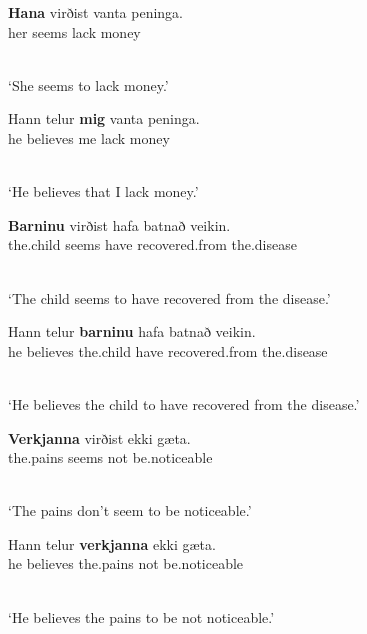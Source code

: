 \documentclass[output=paper]{langsci/langscibook}
\begin{document}
\begin{examples}
\item \label{isl:acc}
  \begin{examples}
  \item 
    \begin{gloss}
      \textbf{Hana} virðist vanta peninga. \\
      her\Acc{} seems lack\Inf{} money
    \end{gloss}\\[\glosslen]
    `She seems to lack money.'
  \item 
    \begin{gloss}
      Hann telur \textbf{mig} vanta peninga. \\
      he\Nom{} believes me\Acc{} lack\Inf{} money
    \end{gloss}\\[\glosslen]
    `He believes that I lack money.'
  \end{examples}
\item \label{isl:dat}
  \begin{examples}
  \item
    \begin{gloss}
      \textbf{Barninu} virðist hafa batnað veikin. \\
      the.child\Dat{} seems have\Inf{} recovered.from the.disease
    \end{gloss}\\[\glosslen]
    `The child seems to have recovered from the disease.'
  \item 
    \begin{gloss}
      Hann telur \textbf{barninu} hafa batnað veikin. \\
      he believes the.child\Dat{} have\Inf{} recovered.from the.disease
    \end{gloss}\\[\glosslen]
    `He believes the child to have recovered from the disease.'
  \end{examples}
\item \label{isl:gen}
  \begin{examples}
  \item
    \begin{gloss}
      \textbf{Verkjanna} virðist ekki g\ae{}ta. \\
      the.pains\Gen{} seems not be.noticeable\Inf{}
    \end{gloss}\\[\glosslen]
    `The pains don't seem to be noticeable.'
  \item 
    \begin{gloss}
      Hann telur \textbf{verkjanna} ekki g\ae{}ta. \\
      he believes the.pains\Gen{} not be.noticeable\Inf{}
    \end{gloss}\\[\glosslen]
    `He believes the pains to be not noticeable.'
  \end{examples}
\end{examples}
\end{document}
